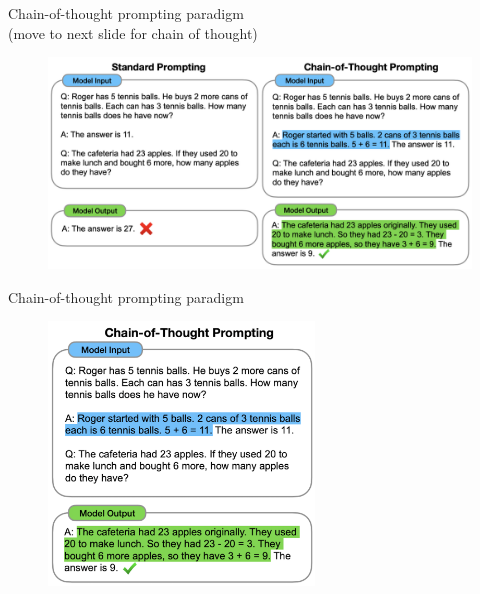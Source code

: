 \begin{vbframe}{Chain-of-thought prompting paradigm\\
(move to next slide for chain of thought)}

\vfill


\begin{figure}
    \centering
    \includegraphics{figure/chain_of_thought.png}\\
\end{figure}

\vfill

\end{vbframe}


\begin{vbframe}{Chain-of-thought prompting paradigm}

\begin{figure}
    \centering
    \includegraphics[height=7cm]{figure/chain_of_thought2.png}
\end{figure}

\end{vbframe}

